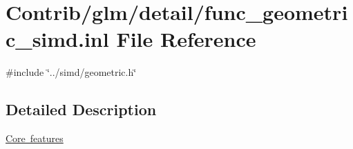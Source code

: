 \hypertarget{func__geometric__simd_8inl}{}\section{Contrib/glm/detail/func\+\_\+geometric\+\_\+simd.inl File Reference}
\label{func__geometric__simd_8inl}
{\ttfamily \#include \char`\"{}../simd/geometric.\+h\char`\"{}}\newline


\subsection{Detailed Description}
\mbox{\hyperlink{group__core}{Core features}} 